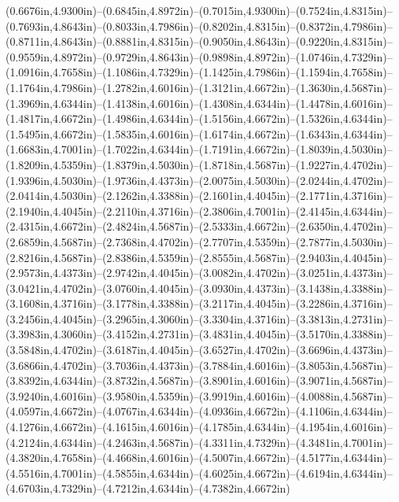 (0.6676in,4.9300in)--(0.6845in,4.8972in)--(0.7015in,4.9300in)--(0.7524in,4.8315in)--(0.7693in,4.8643in)--(0.8033in,4.7986in)--(0.8202in,4.8315in)--(0.8372in,4.7986in)--(0.8711in,4.8643in)--(0.8881in,4.8315in)--(0.9050in,4.8643in)--(0.9220in,4.8315in)--(0.9559in,4.8972in)--(0.9729in,4.8643in)--(0.9898in,4.8972in)--(1.0746in,4.7329in)--(1.0916in,4.7658in)--(1.1086in,4.7329in)--(1.1425in,4.7986in)--(1.1594in,4.7658in)--(1.1764in,4.7986in)--(1.2782in,4.6016in)--(1.3121in,4.6672in)--(1.3630in,4.5687in)--(1.3969in,4.6344in)--(1.4138in,4.6016in)--(1.4308in,4.6344in)--(1.4478in,4.6016in)--(1.4817in,4.6672in)--(1.4986in,4.6344in)--(1.5156in,4.6672in)--(1.5326in,4.6344in)--(1.5495in,4.6672in)--(1.5835in,4.6016in)--(1.6174in,4.6672in)--(1.6343in,4.6344in)--(1.6683in,4.7001in)--(1.7022in,4.6344in)--(1.7191in,4.6672in)--(1.8039in,4.5030in)--(1.8209in,4.5359in)--(1.8379in,4.5030in)--(1.8718in,4.5687in)--(1.9227in,4.4702in)--(1.9396in,4.5030in)--(1.9736in,4.4373in)--(2.0075in,4.5030in)--(2.0244in,4.4702in)--(2.0414in,4.5030in)--(2.1262in,4.3388in)--(2.1601in,4.4045in)--(2.1771in,4.3716in)--(2.1940in,4.4045in)--(2.2110in,4.3716in)--(2.3806in,4.7001in)--(2.4145in,4.6344in)--(2.4315in,4.6672in)--(2.4824in,4.5687in)--(2.5333in,4.6672in)--(2.6350in,4.4702in)--(2.6859in,4.5687in)--(2.7368in,4.4702in)--(2.7707in,4.5359in)--(2.7877in,4.5030in)--(2.8216in,4.5687in)--(2.8386in,4.5359in)--(2.8555in,4.5687in)--(2.9403in,4.4045in)--(2.9573in,4.4373in)--(2.9742in,4.4045in)--(3.0082in,4.4702in)--(3.0251in,4.4373in)--(3.0421in,4.4702in)--(3.0760in,4.4045in)--(3.0930in,4.4373in)--(3.1438in,4.3388in)--(3.1608in,4.3716in)--(3.1778in,4.3388in)--(3.2117in,4.4045in)--(3.2286in,4.3716in)--(3.2456in,4.4045in)--(3.2965in,4.3060in)--(3.3304in,4.3716in)--(3.3813in,4.2731in)--(3.3983in,4.3060in)--(3.4152in,4.2731in)--(3.4831in,4.4045in)--(3.5170in,4.3388in)--(3.5848in,4.4702in)--(3.6187in,4.4045in)--(3.6527in,4.4702in)--(3.6696in,4.4373in)--(3.6866in,4.4702in)--(3.7036in,4.4373in)--(3.7884in,4.6016in)--(3.8053in,4.5687in)--(3.8392in,4.6344in)--(3.8732in,4.5687in)--(3.8901in,4.6016in)--(3.9071in,4.5687in)--(3.9240in,4.6016in)--(3.9580in,4.5359in)--(3.9919in,4.6016in)--(4.0088in,4.5687in)--(4.0597in,4.6672in)--(4.0767in,4.6344in)--(4.0936in,4.6672in)--(4.1106in,4.6344in)--(4.1276in,4.6672in)--(4.1615in,4.6016in)--(4.1785in,4.6344in)--(4.1954in,4.6016in)--(4.2124in,4.6344in)--(4.2463in,4.5687in)--(4.3311in,4.7329in)--(4.3481in,4.7001in)--(4.3820in,4.7658in)--(4.4668in,4.6016in)--(4.5007in,4.6672in)--(4.5177in,4.6344in)--(4.5516in,4.7001in)--(4.5855in,4.6344in)--(4.6025in,4.6672in)--(4.6194in,4.6344in)--(4.6703in,4.7329in)--(4.7212in,4.6344in)--(4.7382in,4.6672in) 